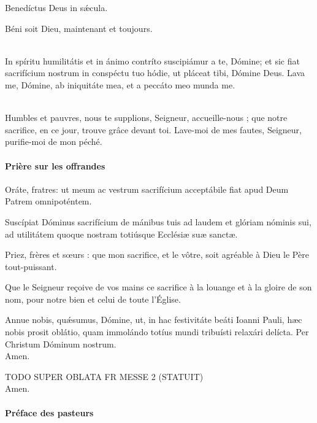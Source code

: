 \documentclass[twoside]{article}
\begin{document}
\begin{paracol}{2}
Benedíctus Deus in sǽcula. 

\switchcolumn

Béni soit Dieu, maintenant et toujours.

\switchcolumn*

\\
In spíritu humilitátis et in ánimo contríto
suscipiámur a te, Dómine;
et sic fiat sacrifícium nostrum in conspéctu tuo hódie,
ut pláceat tibi, Dómine Deus. 
Lava me, Dómine, ab iniquitáte mea,
et a peccáto meo munda me. 

\switchcolumn

~\\
Humbles et pauvres, nous te supplions, Seigneur, accueille-nous ; que notre sacrifice, en ce jour, trouve grâce devant toi. Lave-moi de mes fautes, Seigneur, purifie-moi de mon péché.
\end{paracol}

\paragraph{Prière sur les offrandes}
\begin{paracol}{2}

\vv Oráte, fratres:
ut meum ac vestrum sacrifícium
acceptábile fiat apud Deum Patrem omnipoténtem.

\rr Suscípiat Dóminus sacrifícium de mánibus tuis
ad laudem et glóriam nóminis sui,
ad utilitátem quoque nostram
totiúsque Ecclésiæ suæ sanctæ.

\switchcolumn

\vv Priez, frères et sœurs : que mon sacrifice, et le vôtre, soit agréable à Dieu le Père tout-puissant.

\rr Que le Seigneur reçoive de vos mains ce sacrifice à la louange et à la gloire de son nom, pour notre bien et celui de toute l’Église.

\switchcolumn*

Annue nobis, quǽsumus, Dómine,
ut, in hac festivitáte beáti Ioanni Pauli, hæc nobis prosit oblátio,
quam immolándo totíus mundi tribuísti relaxári delícta.
Per Christum Dóminum nostrum.\\
\rr Amen.

\switchcolumn
TODO SUPER OBLATA FR MESSE 2 (STATUIT)\\ 
\rr Amen.

\end{paracol}

\paragraph{Préface des pasteurs}
\end{document}
